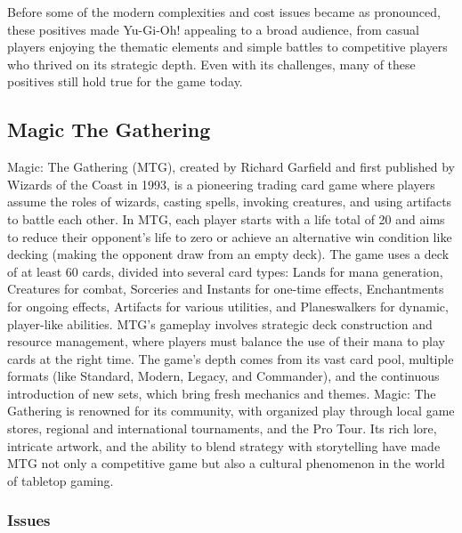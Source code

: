 Before some of the modern complexities and cost issues became as pronounced, these positives made Yu-Gi-Oh! appealing to a broad audience, from casual players enjoying the thematic elements and simple battles to competitive players who thrived on its strategic depth. Even with its challenges, many of these positives still hold true for the game today.














\subsection{Magic The Gathering}

Magic: The Gathering (MTG), created by Richard Garfield and first published by Wizards of the Coast in 1993, is a pioneering trading card game where players assume the roles of wizards, casting spells, invoking creatures, and using artifacts to battle each other. In MTG, each player starts with a life total of 20 and aims to reduce their opponent's life to zero or achieve an alternative win condition like decking (making the opponent draw from an empty deck). The game uses a deck of at least 60 cards, divided into several card types: Lands for mana generation, Creatures for combat, Sorceries and Instants for one-time effects, Enchantments for ongoing effects, Artifacts for various utilities, and Planeswalkers for dynamic, player-like abilities. MTG's gameplay involves strategic deck construction and resource management, where players must balance the use of their mana to play cards at the right time. The game's depth comes from its vast card pool, multiple formats (like Standard, Modern, Legacy, and Commander), and the continuous introduction of new sets, which bring fresh mechanics and themes. Magic: The Gathering is renowned for its community, with organized play through local game stores, regional and international tournaments, and the Pro Tour. Its rich lore, intricate artwork, and the ability to blend strategy with storytelling have made MTG not only a competitive game but also a cultural phenomenon in the world of tabletop gaming.

\subsubsection{Issues}


